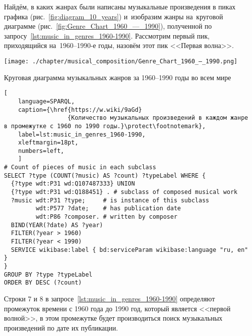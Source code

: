 Найдём, в каких жанрах были написаны музыкальные произведения 
в пиках графика (рис.~\ref{fig:diagram_10_years}) 
и~изобразим жанры на~круговой диаграмме (рис.~\ref{fig:Genre_Chart_1960_—_1990}), 
полученной по запросу~\ref{lst:music_in_genres_1960-1990}. 
Рассмотрим первый пик, приходящийся на~1960--1990-е годы, назовём этот пик <<Первая волна>>.

\begin{marginfigure}[0\baselineskip]
	\texttt{[image: ./chapter/musical\_composition/Genre\_Chart\_1960\_—\_1990.png]}
	\caption{Круговая диаграмма музыкальных жанров за 1960--1990 годы во всем мире}%
	\label{fig:Genre_Chart_1960_—_1990}%
\end{marginfigure}

\begin{lstlisting}[ 
    language=SPARQL,
    caption={\href{https://w.wiki/9aGd}
                  {Количество музыкальных произведений в каждом жанре в промежутке с 1960 по 1990 годы.}\protect\footnotemark},
    label=lst:music_in_genres_1960-1990,
    xleftmargin=18pt,
    numbers=left,
    ]
# Count of pieces of music in each subclass
SELECT ?type (COUNT(?music) AS ?count) ?typeLabel WHERE {
  {?type wdt:P31 wd:Q107487333} UNION 
  {?type wdt:P31 wd:Q188451} . # subclass of composed musical work
  ?music wdt:P31 ?type;     # is instance of this subclass
         wdt:P577 ?date;    # has publication date
         wdt:P86 ?composer. # written by composer
  BIND(YEAR(?date) AS ?year)
  FILTER(?year > 1960)        
  FILTER(?year < 1990)
  SERVICE wikibase:label { bd:serviceParam wikibase:language "ru, en" }
}
GROUP BY ?type ?typeLabel
ORDER BY DESC (?count)
\end{lstlisting}%

Строки 7 и 8 в запросе~\ref{lst:music_in_genres_1960-1990} определяют промежуток времени с 1960 года до 1990 год, который является <<первой волной>>, в этом промежутке будет производиться поиск музыкальных произведений по дате их публикации.

